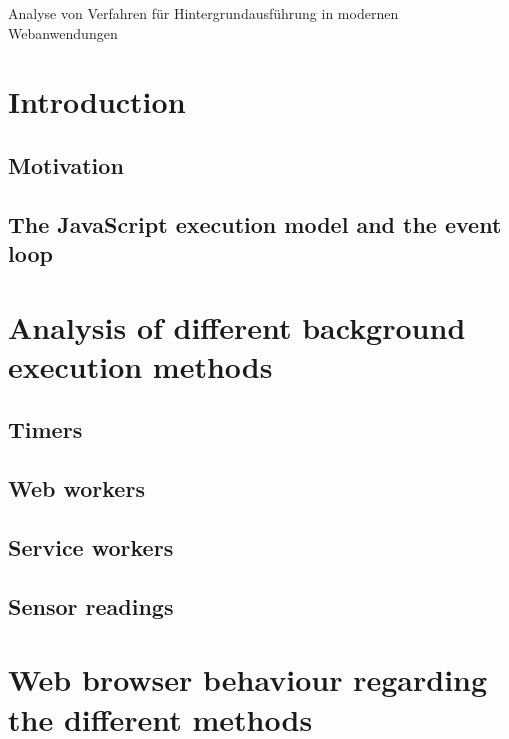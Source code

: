 \documentclass[article,type=bsc,colorback,accentcolor=tud9c]{tudthesis}
\begin{document}
    {Analyse von Verfahren für Hintergrundausführung in modernen Webanwendungen}
  \author{Yannick Reifschneider}
  \dateofexam{\today}{\today}
  \makethesistitle

  \tableofcontents

  \newpage
  \section{Introduction}

  \subsection{Motivation}
  
  \subsection{The JavaScript execution model and the event loop}

  \newpage
  \section{Analysis of different background execution methods}

  \subsection{Timers}

  \subsection{Web workers}

  \subsection{Service workers}

  \subsection{Sensor readings}

  \newpage
  \section{Web browser behaviour regarding the different methods}
\end{document}
